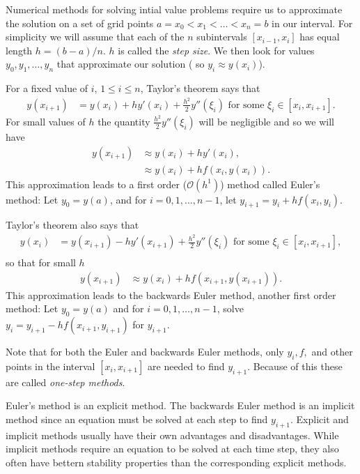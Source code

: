 Numerical methods for solving intial value problems require us to approximate the solution on a set of grid points $a = x_0< x_1<\hdots< x_n = b$ in our interval.  For simplicity we will assume that each of the $n$ subintervals $[x_{i-1},x_i]$ has equal length $h = (b-a)/n$. $h$ is called the \textit{step size}. We then look for values $y_0,y_1, \hdots, y_n$ that approximate our solution ( so $y_i \approx y(x_i)$).  

For a fixed value of $i$, $ 1 \leq i \leq n$, Taylor's theorem says that 
\begin{align*}
y(x_{i+1}) &= y(x_{i}) + h y'(x_i) + \frac{h^2}{2} y''(\xi_i)\text{ for some }\xi_i \in [x_i,x_{i+1}].
\end{align*}
For small values of $h$ the quantity $\frac{h^2}{2} y''(\xi_i)$ will be negligible and so we will have
\begin{align*}
y(x_{i+1}) &\approx y(x_{i}) + h y'(x_i)  ,\\
&\approx y(x_{i}) + h f(x_i,y(x_i)).
\end{align*}
This approximation leads to a first order ($\mathcal{O}(h^1)$) method called Euler's method: Let $y_0 = y(a)$, and for $i = 0, 1, \hdots, n-1$, let $y_{i+1} = y_i +hf(x_i,y_i)$. 

Taylor's theorem also says that 
\begin{align*}
y(x_{i}) &= y(x_{i+1}) - h y'(x_{i+1}) + \frac{h^2}{2} y''(\xi_i) \text{ for some } \xi_i \in [x_i,x_{i+1}], \\
\end{align*}
so that for small $h$
\begin{align*}
y(x_{i+1}) &\approx  y(x_{i}) + h f(x_{i+1},y(x_{i+1})).
\end{align*}
This approximation leads to the backwards Euler method, another first order method: Let $y_0 = y(a)$ and for $i = 0, 1, \hdots, n-1$, solve  $y_{i} = y_{i+1}-hf(x_{i+1},y_{i+1})$ for $y_{i+1}$.

Note that for both the Euler and backwards Euler methods, only $y_i, f, $ and other points in the interval $[x_i, x_{i+1}]$ are needed to find $y_{i+1}$. Because of this these are called \textit{one-step methods}. 

Euler's method is an explicit method. The backwards Euler method is an implicit method since an equation must be solved at each step to find $y_{i+1}$. Explicit and implicit methods usually have their own advantages and disadvantages. While implicit methods require an equation to be solved at each time step, they also often have bettern stability properties than the corresponding explicit methods.

